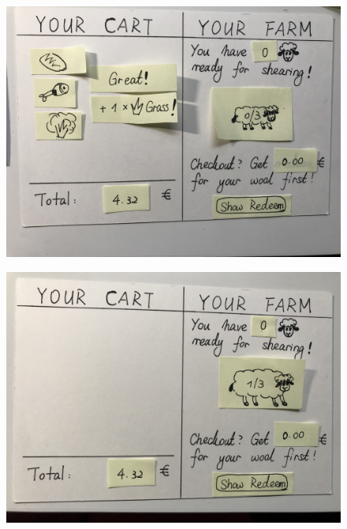\documentclass[a4paper,10pt,oneside]{scrreprt}
\begin{document}
\begin{figure}[h]
	\centering
	\includegraphics[scale=0.10, clip, trim={0em 0em 0em 0em}]{images/IMG_0572.jpg}
\end{figure}

\begin{figure}[h]
	\centering
	\includegraphics[scale=0.10, clip, trim={0em 0em 0em 0em}]{images/IMG_0576.jpg}
\end{figure}
\end{document}
